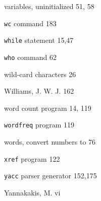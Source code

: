 \begin{multicols}{3}
\hangindent=3pc  variables, uninitialized 51, 58

\hangindent=3pc  \verb'wc' command 183

\hangindent=3pc  \verb'while' statement 15,47

\hangindent=3pc  \verb'who' command 62

\hangindent=3pc  wild-card characters 26

\hangindent=3pc  Williams, J. W. J. 162

\hangindent=3pc  word count program 14, 119

\hangindent=3pc  \verb'wordfreq' program 119

\hangindent=3pc  words, convert numbers to 76

\hangindent=3pc  \verb'xref' program 122

\hangindent=3pc  \verb'yacc' parser generator 152,175

\hangindent=3pc  Yannakakis, M. vi

\end{multicols}
